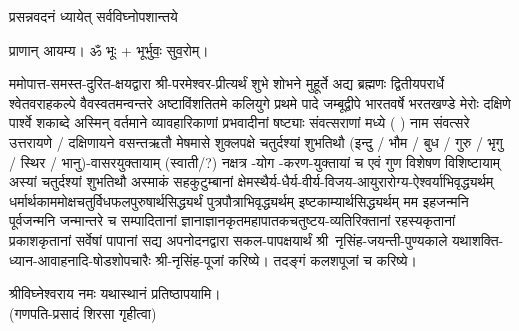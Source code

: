 



{प्रसन्नवदनं ध्यायेत् सर्वविघ्नोपशान्तये}

प्राणान् आयम्य। ॐ भूः + भूर्भुवः॒ सुव॒रोम्।


ममोपात्त-समस्त-दुरित-क्षयद्वारा श्री-परमेश्वर-प्रीत्यर्थं शुभे शोभने मुहूर्ते अद्य ब्रह्मणः
द्वितीयपरार्धे श्वेतवराहकल्पे वैवस्वतमन्वन्तरे अष्टाविंशतितमे कलियुगे प्रथमे पादे
जम्बूद्वीपे भारतवर्षे भरतखण्डे मेरोः दक्षिणे पार्श्वे शकाब्दे अस्मिन् वर्तमाने व्यावहारिकाणां प्रभवादीनां षष्ट्याः संवत्सराणां मध्ये (	) नाम संवत्सरे उत्तरायणे / दक्षिणायने
वसन्तऋतौ मेषमासे शुक्लपक्षे चतुर्दश्यां शुभतिथौ
(इन्दु / भौम / बुध / गुरु / भृगु / स्थिर / भानु)-वासरयुक्तायाम्
(स्वाती/?) नक्षत्र \blank{}-योग \blank-करण-युक्तायां च एवं गुण विशेषण विशिष्टायाम्
अस्यां	चतुर्दश्यां शुभतिथौ
अस्माकं सहकुटुम्बानां क्षेमस्थैर्य-धैर्य-वीर्य-विजय-आयुरारोग्य-ऐश्वर्याभिवृद्ध्यर्थम्
धर्मार्थकाममोक्ष\-चतुर्विधफलपुरुषार्थसिद्ध्यर्थं पुत्रपौत्राभि\-वृद्ध्यर्थम् इष्टकाम्यार्थसिद्ध्यर्थम्
मम इहजन्मनि पूर्वजन्मनि जन्मान्तरे च सम्पादितानां ज्ञानाज्ञानकृतमहा\-पातकचतुष्टय-व्यतिरिक्तानां रहस्यकृतानां प्रकाशकृतानां सर्वेषां पापानां सद्य अपनोदनद्वारा सकल-पापक्षयार्थं
श्री~नृसिंह-जयन्ती-पुण्यकाले
यथाशक्ति-ध्यान-आवाहनादि-षोडशो\-पचारैः श्री-नृसिंह-पूजां करिष्ये।
तदङ्गं कलशपूजां च करिष्ये।

श्रीविघ्नेश्वराय नमः यथास्थानं प्रतिष्ठापयामि।\\
(गणपति-प्रसादं शिरसा गृहीत्वा)
\renewcommand{\devaName}{विष्णु}













